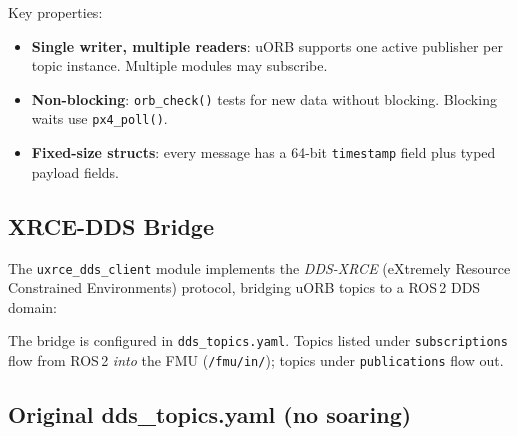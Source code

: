 \documentclass[12pt,a4paper]{article}
\begin{document}
Key properties:
\begin{itemize}
  \item \textbf{Single writer, multiple readers}: uORB supports one active
        publisher per topic instance. Multiple modules may subscribe.
  \item \textbf{Non-blocking}: \texttt{orb\_check()} tests for new data
        without blocking. Blocking waits use \texttt{px4\_poll()}.
  \item \textbf{Fixed-size structs}: every message has a 64-bit
        \texttt{timestamp} field plus typed payload fields.
\end{itemize}

\subsection{XRCE-DDS Bridge}

The \texttt{uxrce\_dds\_client} module implements the
\emph{DDS-XRCE} (eXtremely Resource Constrained Environments) protocol,
bridging uORB topics to a ROS\,2 DDS domain:

\begin{center}
\end{center}

The bridge is configured in \texttt{dds\_topics.yaml}. Topics listed under
\texttt{subscriptions} flow from ROS\,2 \emph{into} the FMU
(\texttt{/fmu/in/}); topics under \texttt{publications} flow out.

\subsection{Original dds\_topics.yaml (no soaring)}
\end{document}
